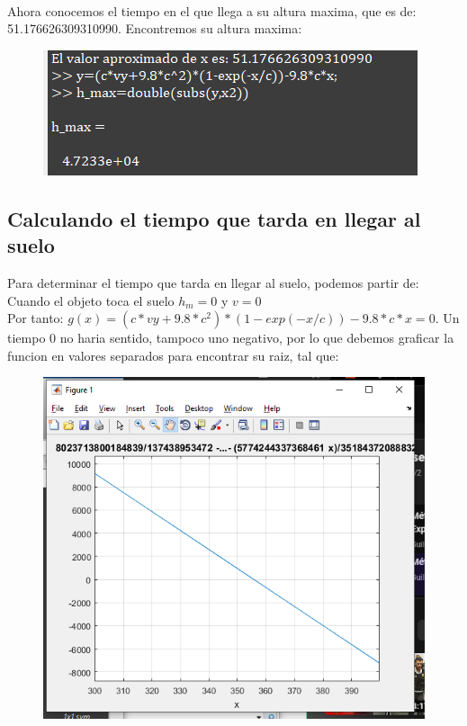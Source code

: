 \documentclass{article}
\theoremstyle{mytheoremstyle}
\theoremstyle{mytheoremstyle}
\theoremstyle{myproblemstyle}
\begin{document}
\\Ahora conocemos el tiempo en el que llega a su altura maxima, que es de: 51.176626309310990. Encontremos su altura maxima:
\begin{figure}[ht]
    \includegraphics*[scale=1]{img/secante08.png}
\end{figure}

\subsection*{Calculando el tiempo que tarda en llegar al suelo}
Para determinar el tiempo que tarda en llegar al suelo, podemos partir de: Cuando el objeto toca el suelo $h_m=0$ y $v=0$ 
\\Por tanto: $g(x)=(c*vy+9.8*c^2)*(1-exp(-x/c))-9.8*c*x=0$. Un tiempo 0 no haria sentido, tampoco uno negativo, por lo que debemos graficar la funcion en valores separados para encontrar su raiz, tal que:
\begin{figure}[ht]
    \includegraphics*[scale=0.5]{img/secante09.png}
\end{figure}
\end{document}

